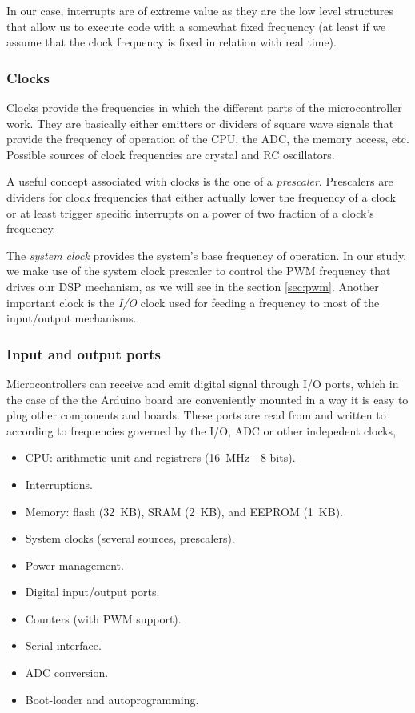 In our case, interrupts are of extreme value as they are the low level
structures that allow us to execute code with a somewhat fixed frequency (at
least if we assume that the clock frequency is fixed in relation with real
time).

\subsubsection{Clocks}

Clocks provide the frequencies in which the different parts of the
microcontroller work. They are basically either emitters or dividers of square
wave signals that provide the frequency of operation of the CPU, the ADC,
the memory access, etc. Possible sources of clock frequencies are crystal
and RC oscillators.

A useful concept associated with clocks is the one of a \emph{prescaler}.
Prescalers are dividers for clock frequencies that either actually lower the
frequency of a clock or at least trigger specific interrupts on a power of two
fraction of a clock's frequency.

The \emph{system clock} provides the system's base frequency of operation. In
our study, we make use of the system clock prescaler to control the PWM
frequency that drives our DSP mechanism, as we will see in the section
\ref{sec:pwm}. Another important clock is the \emph{I/O} clock used for
feeding a frequency to most of the input/output mechanisms.

\subsubsection{Input and output ports}

Microcontrollers can receive and emit digital signal through I/O ports, which
in the case of the the Arduino board are conveniently mounted in a way it is
easy to plug other components and boards. These ports are read from and
written to according to frequencies governed by the I/O, ADC or other
indepedent clocks,



\begin{itemize}
    \item CPU: arithmetic unit and registrers (16~MHz - 8 bits).
    \item Interruptions.
    \item Memory: flash (32~KB), SRAM (2~KB), and EEPROM (1~KB).
    \item System clocks (several sources, prescalers).
    \item Power management.
    \item Digital input/output ports.
    \item Counters (with PWM support).
    \item Serial interface.
    \item ADC conversion.
    \item Boot-loader and autoprogramming.
\end{itemize}


